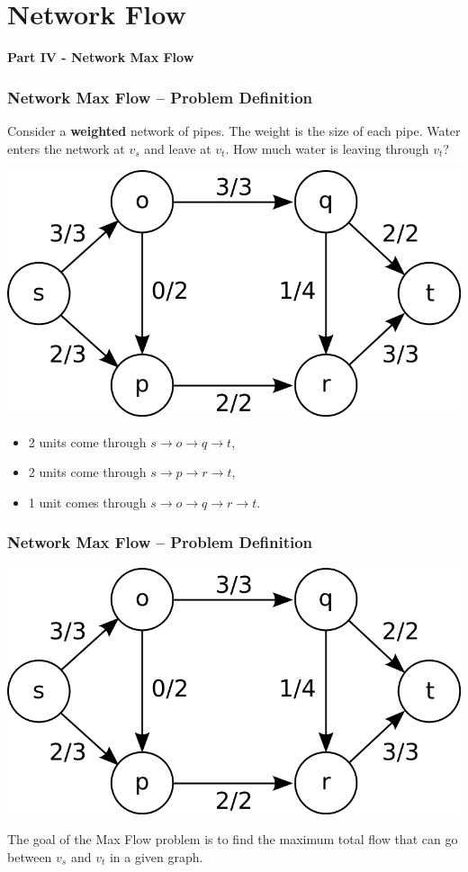 \section{Network Flow}

\begin{frame}
  \begin{center}
    {\bf Part IV - Network Max Flow}
  \end{center}
\end{frame}

\begin{frame}
  \frametitle{Network Max Flow -- Problem Definition}

  \begin{block}{}
    Consider a {\bf weighted} network of pipes. The weight is the size of each pipe. Water enters the network at $v_s$ and leave at $v_t$. How much water is leaving through $v_t$?
  \end{block}

  \begin{center}
    \includegraphics[width=.45\textwidth]{../img/maxflow_wiki}
  \end{center}

  \begin{itemize}
    \item 2 units come through $s\to o \to q \to t$,
    \item 2 units come through $s\to p\to r\to t$,
    \item 1 unit comes through $s\to o\to q\to r\to t$.
  \end{itemize}
\end{frame}

\begin{frame}
  \frametitle{Network Max Flow -- Problem Definition}
  \begin{center}
    \includegraphics[width=.55\textwidth]{../img/maxflow_wiki}
  \end{center}
  \bigskip

  The goal of the Max Flow problem is to find the maximum total flow that can go between $v_s$ and $v_t$ in a given graph.
\end{frame}


